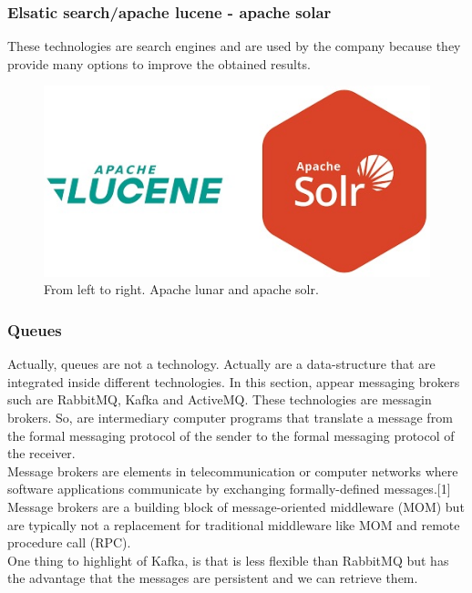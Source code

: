 \documentclass[12pt]{article}
\begin{document}
\subsubsection*{Elsatic search/apache lucene - apache solar}
These technologies are search engines and are used by the company because they provide many options to improve the obtained results.
\begin{figure}[H]
    \centering
    \includegraphics[scale = 0.7]{Images/apache.jpg}
    \caption{From left to right. Apache lunar and apache solr.}
    \label{fig:apache}
\end{figure}
\subsubsection*{Queues}
Actually, queues are not a technology. Actually are a data-structure that are integrated inside different technologies.
In this section, appear messaging brokers such are RabbitMQ, Kafka and ActiveMQ. These technologies are messagin brokers. So, are intermediary computer programs that translate a message from the formal messaging protocol of the sender to the formal messaging protocol of the receiver.\\
Message brokers are elements in telecommunication or computer networks where software applications communicate by exchanging formally-defined messages.[1] Message brokers are a building block of message-oriented middleware (MOM) but are typically not a replacement for traditional middleware like MOM and remote procedure call (RPC).\\
One thing to highlight of Kafka, is that is less flexible than RabbitMQ but has the advantage that the messages are persistent and we can retrieve them.
\end{document}
